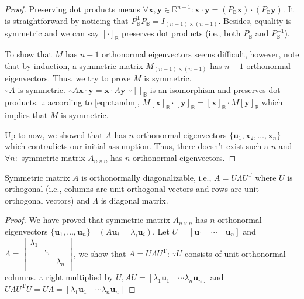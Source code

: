\begin{proof}
Preserving dot products means
$\forall{}\mathbf{x},\mathbf{y}\in{}\mathbb{R}^{n-1}:\mathbf{x}\cdot{}\mathbf{y}=(P_{\mathbb{B}}\mathbf{x})\cdot{}(P_{\mathbb{B}}\mathbf{y})$.
It is straightforward by noticing that
$P_{\mathbb{B}}^{\mathrm{T}}P_{\mathbb{B}}=I_{(n-1)\times{}(n-1)}$.
Besides, equality is symmetric and we can say $[\cdot]_{\mathbb{B}}$
preserves dot products (i.e., both $P_{\mathbb{B}}$ and $P_{\mathbb{B}}^{-1}$).


To show that $M$ has $n-1$ orthonormal eigenvectors seems difficult,
   however, note that by induction, a symmetric matrix
   $M_{(n-1)\times{}(n-1)}$ has $n-1$ orthonormal eigenvectors. Thus,
   we try to prove $M$ is symmetric.\\
$\because{}A$ is symmetric.
$\therefore{}A\mathbf{x}\cdot{}\mathbf{y}=\mathbf{x}\cdot{}A\mathbf{y}$ 
$\because{}[]_{\mathbb{B}}$ is an isomorphism and preserves dot
products. $\therefore{}$ according to \eqref{eqn:tandm},
    $M[\mathbf{x}]_{\mathbb{B}}\cdot{}[\mathbf{y}]_{\mathbb{B}}=[\mathbf{x}]_{\mathbb{B}}\cdot{}M[\mathbf{y}]_{\mathbb{B}}$
    which implies that $M$ is symmetric.


Up to now, we showed that $A$ has $n$ orthonormal eigenvectors
$\{\mathbf{u}_{1},\mathbf{x}_{2},\ldots,\mathbf{x}_{n}\}$ which
contradicts our initial assumption. Thus, there doesn't exist such a
$n$ and $\forall{}n:$ symmetric matrix $A_{n\times{}n}$ has $n$ orthonormal eigenvectors.
\end{proof}


\begin{conclusion}
Symmetric matrix $A$ is orthonormally diagonalizable, i.e.,
          $A=U\Lambda{}U^{\mathrm{T}}$ where $U$ is orthogonal
          (i.e., columns are unit orthogonal vectors and rows are unit
           orthogonal vectors) and $\Lambda$ is diagonal matrix.
\end{conclusion}
\begin{proof}
We have proved that symmetric matrix $A_{n\times{}n}$ has $n$
orthonormal eigenvectors
$\{\mathbf{u}_{1},\ldots,\mathbf{u}_{n}\}\quad{}(A\mathbf{u}_{i}=\lambda_{i}\mathbf{u}_{i})$.
Let $U=[\mathbf{u}_{1}\quad{}\cdots{}\quad{}\mathbf{u}_{n}]$ and
$\Lambda{}=\begin{bmatrix}\lambda_1& & \\ &\ddots&\\ &
&\lambda_n\\\end{bmatrix}$, we show that $A=U\Lambda{}U^{\mathrm{T}}$:
$\because{}U$ consists of unit orthonormal columns. $\therefore{}$ right multiplied by
$U,AU=[\lambda_{1}\mathbf{u}_{1}\quad{}\cdots{}\lambda_{n}\mathbf{u}_{n}]$
and $U\Lambda{}U^{\mathrm{T}}U=U\Lambda{}=[\lambda_{1}\mathbf{u}_{1}\quad{}\cdots{}\lambda_{n}\mathbf{u}_{n}]$
\end{proof}


